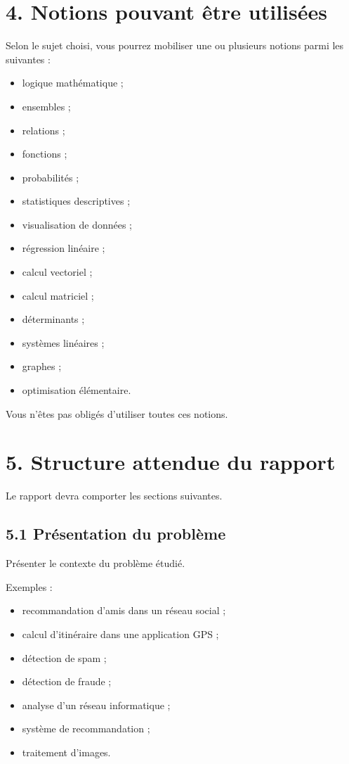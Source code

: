 \documentclass[12pt,a4paper]{article}
\begin{document}
\vspace{0.3cm}

\section*{4. Notions pouvant être utilisées}

Selon le sujet choisi, vous pourrez mobiliser une ou plusieurs notions parmi les suivantes :

\begin{itemize}
\item logique mathématique ;
\item ensembles ;
\item relations ;
\item fonctions ;
\item probabilités ;
\item statistiques descriptives ;
\item visualisation de données ;
\item régression linéaire ;
\item calcul vectoriel ;
\item calcul matriciel ;
\item déterminants ;
\item systèmes linéaires ;
\item graphes ;
\item optimisation élémentaire.
\end{itemize}

Vous n'êtes pas obligés d'utiliser toutes ces notions.

\vspace{0.3cm}

\section*{5. Structure attendue du rapport}

Le rapport devra comporter les sections suivantes.

\subsection*{5.1 Présentation du problème}

Présenter le contexte du problème étudié.

Exemples :

\begin{itemize}
\item recommandation d'amis dans un réseau social ;
\item calcul d'itinéraire dans une application GPS ;
\item détection de spam ;
\item détection de fraude ;
\item analyse d'un réseau informatique ;
\item système de recommandation ;
\item traitement d'images.
\end{itemize}
\end{document}

